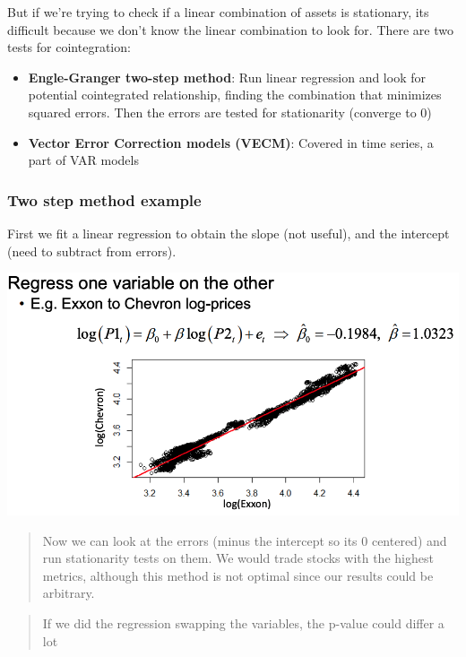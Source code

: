 \documentclass[
  oneside]{book}
\providecommand{\tightlist}{%
  \setlength{\itemsep}{0pt}\setlength{\parskip}{0pt}}
\begin{document}
But if we're trying to check if a linear combination of assets is stationary, its difficult because we don't know the linear combination to look for. There are two tests for cointegration:

\begin{itemize}
\tightlist
\item
  \textbf{Engle-Granger two-step method}: Run linear regression and look for potential cointegrated relationship, finding the combination that minimizes squared errors. Then the errors are tested for stationarity (converge to 0)
\item
  \textbf{Vector Error Correction models (VECM)}: Covered in time series, a part of VAR models
\end{itemize}

\hypertarget{two-step-method-example}{%
\subsubsection{Two step method example}\label{two-step-method-example}}

First we fit a linear regression to obtain the slope (not useful), and the intercept (need to subtract from errors).

\includegraphics{Notes/Obsidian-Attachments/9-Statistical-Arbitrage-10.png}

\begin{quote}
Now we can look at the errors (minus the intercept so its 0 centered) and run stationarity tests on them. We would trade stocks with the highest metrics, although this method is not optimal since our results could be arbitrary.
\end{quote}

\begin{quote}
If we did the regression swapping the variables, the p-value could differ a lot
\end{quote}
\end{document}
